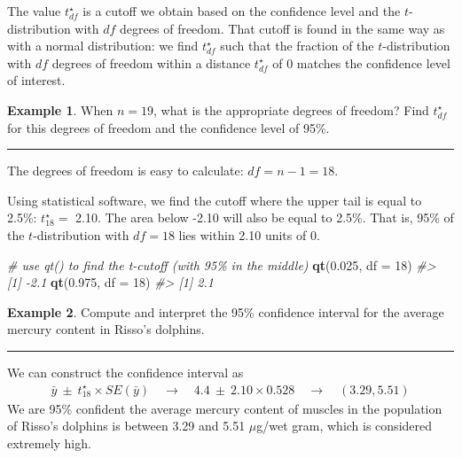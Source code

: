 \documentclass[
  10pt,
  openany]{book}
\newenvironment{Shaded}{\begin{snugshade}}{\end{snugshade}}
\newcommand{\AttributeTok}[1]{\textcolor[rgb]{0.13,0.29,0.53}{#1}}
\newcommand{\CommentTok}[1]{\textcolor[rgb]{0.56,0.35,0.01}{\textit{#1}}}
\newcommand{\DecValTok}[1]{\textcolor[rgb]{0.00,0.00,0.81}{#1}}
\newcommand{\FloatTok}[1]{\textcolor[rgb]{0.00,0.00,0.81}{#1}}
\newcommand{\FunctionTok}[1]{\textcolor[rgb]{0.13,0.29,0.53}{\textbf{#1}}}
\newcommand{\NormalTok}[1]{#1}
\theoremstyle{definition}
\theoremstyle{definition}
\newtheorem{example}{Example}[chapter]
\theoremstyle{definition}
\theoremstyle{definition}
\theoremstyle{remark}
\begin{document}
The value \(t^{\star}_{df}\) is a cutoff we obtain based on the
confidence level and the \(t\)-distribution with \(df\) degrees
of freedom.
That cutoff is found in the same way as with a normal
distribution: we find \(t^{\star}_{df}\) such that
the fraction of the \(t\)-distribution with \(df\) degrees
of freedom within a distance \(t^{\star}_{df}\)
of 0 matches the confidence level of interest.

\begin{example}
When \(n = 19\), what is the appropriate
degrees of freedom?
Find \(t^{\star}_{df}\) for this degrees of freedom
and the confidence level of 95\%.

\begin{center}\rule{0.5\linewidth}{0.5pt}\end{center}

The degrees of freedom is easy to calculate:
\(df = n - 1 = 18\).

Using statistical software, we find the cutoff where
the upper tail is equal to 2.5\%:
\(t^{\star}_{18} =\) 2.10.
The area below -2.10 will also be equal to 2.5\%.
That is, 95\% of the \(t\)-distribution with \(df = 18\)
lies within 2.10 units of 0.
\end{example}

\begin{Shaded}
\begin{Highlighting}[]
\CommentTok{\# use qt() to find the t{-}cutoff (with 95\% in the middle)}
\FunctionTok{qt}\NormalTok{(}\FloatTok{0.025}\NormalTok{, }\AttributeTok{df =} \DecValTok{18}\NormalTok{)}
\CommentTok{\#\textgreater{} [1] {-}2.1}
\FunctionTok{qt}\NormalTok{(}\FloatTok{0.975}\NormalTok{, }\AttributeTok{df =} \DecValTok{18}\NormalTok{)}
\CommentTok{\#\textgreater{} [1] 2.1}
\end{Highlighting}
\end{Shaded}

\begin{example}
Compute and interpret the 95\% confidence interval
for the average mercury content in Risso's dolphins.

\begin{center}\rule{0.5\linewidth}{0.5pt}\end{center}

We can construct the confidence interval as
\begin{align*}
  \bar{y} \ \pm\  t^{\star}_{18} \times SE(\bar{y})
    \quad \to \quad 4.4 \ \pm\  2.10 \times 0.528
    \quad \to \quad (3.29, 5.51)
  \end{align*}
We are 95\% confident the average mercury content of muscles
in the population of Risso's dolphins is between 3.29 and 5.51 \(\mu\)g/wet gram,
which is considered extremely high.
\end{example}
\end{document}

